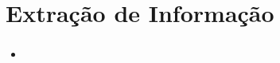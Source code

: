 \section{Extra\c{c}\~ao de Informa\c{c}\~ao}
	\begin{frame}
		\frametitle{}
		\begin{itemize}
			\item 
		\end{itemize}
	\end{frame}